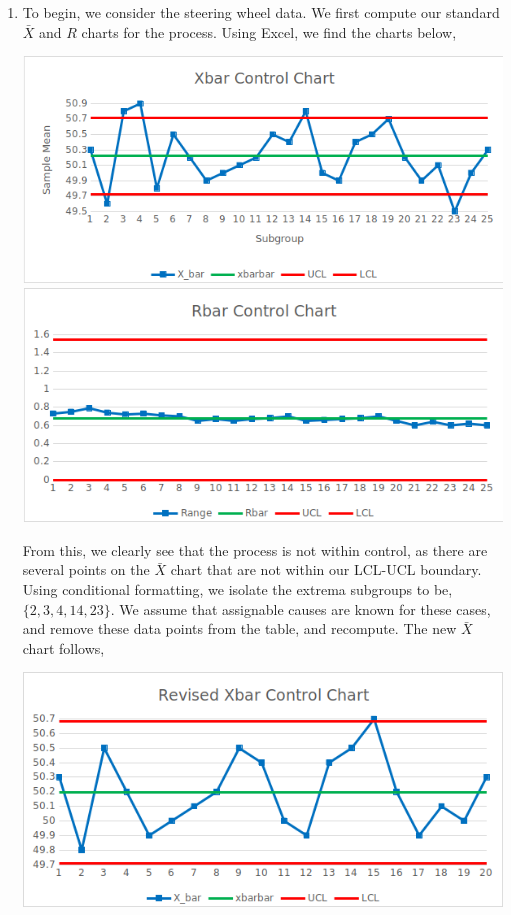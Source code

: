 \documentclass[letterpaper,10pt]{article}
\begin{document}
\begin{enumerate}
\item To begin, we consider the steering wheel data. We first compute our standard $\bar{X}$ and $R$ charts for the process. Using Excel, we find the charts below,
\begin{center}
\includegraphics[scale=1]{1a.png}
\includegraphics[scale=1]{1b.png}
\end{center}
From this, we clearly see that the process is not within control, as there are several points on the $\bar{X}$ chart that are not within our LCL-UCL boundary. Using conditional formatting, we isolate the extrema subgroups to be, $\{2,3,4,14,23\}$. We assume that assignable causes are known for these cases, and remove these data points from the table, and recompute. The new $\bar{X}$ chart follows,
\begin{center}
\includegraphics[scale=1]{1c.png}

\end{center}
\end{enumerate}
\end{document}
